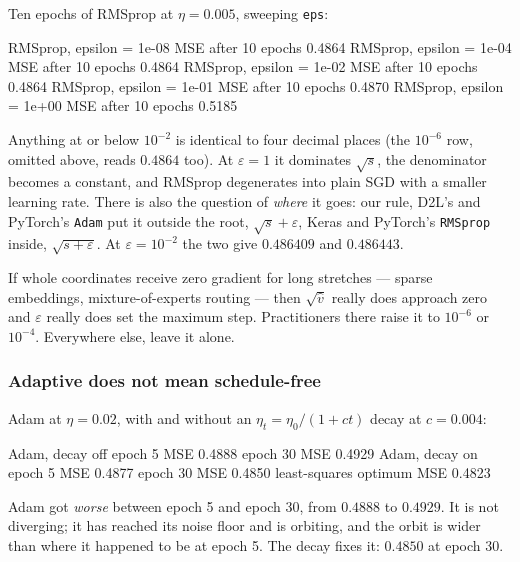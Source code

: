 \documentclass[11pt]{article}
\begin{document}
Ten epochs of RMSprop at $\eta = 0.005$, sweeping \texttt{eps}:

\begin{codeout}
RMSprop, epsilon =   1e-08   MSE after 10 epochs 0.4864
RMSprop, epsilon =   1e-04   MSE after 10 epochs 0.4864
RMSprop, epsilon =   1e-02   MSE after 10 epochs 0.4864
RMSprop, epsilon =   1e-01   MSE after 10 epochs 0.4870
RMSprop, epsilon =   1e+00   MSE after 10 epochs 0.5185
\end{codeout}

Anything at or below $10^{-2}$ is identical to four decimal places (the
$10^{-6}$ row, omitted above, reads $0.4864$ too). At $\varepsilon = 1$ it
dominates $\sqrt{s}$, the denominator becomes a constant, and RMSprop
degenerates into plain SGD with a smaller learning rate. There is also the
question of \emph{where} it goes: our rule, D2L's and PyTorch's \texttt{Adam}
put it outside the root, $\sqrt{s} + \varepsilon$, Keras and PyTorch's
\texttt{RMSprop} inside, $\sqrt{s + \varepsilon}$. At $\varepsilon = 10^{-2}$
the two give $0.486409$ and $0.486443$.

\begin{caution}
If whole coordinates receive zero gradient for long stretches --- sparse
embeddings, mixture-of-experts routing --- then $\sqrt{\hat v}$ really does
approach zero and $\varepsilon$ really does set the maximum step. Practitioners
there raise it to $10^{-6}$ or $10^{-4}$. Everywhere else, leave it alone.
\end{caution}

\subsubsection*{Adaptive does not mean schedule-free}

Adam at $\eta = 0.02$, with and without an $\eta_t = \eta_0/(1+ct)$ decay at
$c = 0.004$:

\begin{codeout}
Adam, decay off  epoch  5   MSE 0.4888    epoch 30   MSE 0.4929
Adam, decay on   epoch  5   MSE 0.4877    epoch 30   MSE 0.4850
least-squares optimum                                MSE 0.4823
\end{codeout}

Adam got \emph{worse} between epoch 5 and epoch 30, from $0.4888$ to $0.4929$.
It is not diverging; it has reached its noise floor and is orbiting, and the
orbit is wider than where it happened to be at epoch 5. The decay fixes it:
$0.4850$ at epoch 30.
\end{document}
